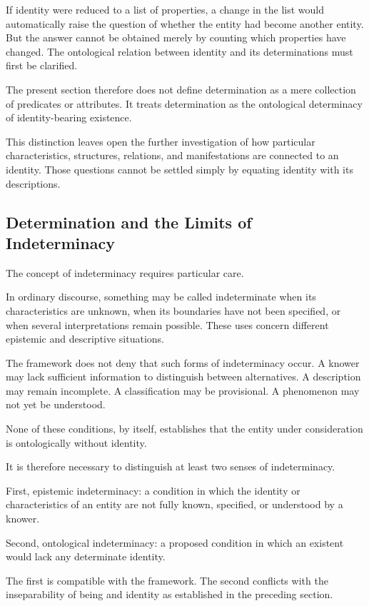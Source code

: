If identity were reduced to a list of properties, a change in the
list would automatically raise the question of whether the entity
had become another entity. But the answer cannot be obtained merely
by counting which properties have changed. The ontological relation
between identity and its determinations must first be clarified.

The present section therefore does not define determination as a
mere collection of predicates or attributes. It treats determination
as the ontological determinacy of identity-bearing existence.

This distinction leaves open the further investigation of how
particular characteristics, structures, relations, and manifestations
are connected to an identity. Those questions cannot be settled
simply by equating identity with its descriptions.

\subsection{Determination and the Limits of Indeterminacy}

The concept of indeterminacy requires particular care.

In ordinary discourse, something may be called indeterminate when
its characteristics are unknown, when its boundaries have not been
specified, or when several interpretations remain possible. These
uses concern different epistemic and descriptive situations.

The framework does not deny that such forms of indeterminacy occur.
A knower may lack sufficient information to distinguish between
alternatives. A description may remain incomplete. A classification
may be provisional. A phenomenon may not yet be understood.

None of these conditions, by itself, establishes that the entity
under consideration is ontologically without identity.

It is therefore necessary to distinguish at least two senses of
indeterminacy.

First, epistemic indeterminacy: a condition in which the identity
or characteristics of an entity are not fully known, specified,
or understood by a knower.

Second, ontological indeterminacy: a proposed condition in which
an existent would lack any determinate identity.

The first is compatible with the framework. The second conflicts
with the inseparability of being and identity as established in
the preceding section.

